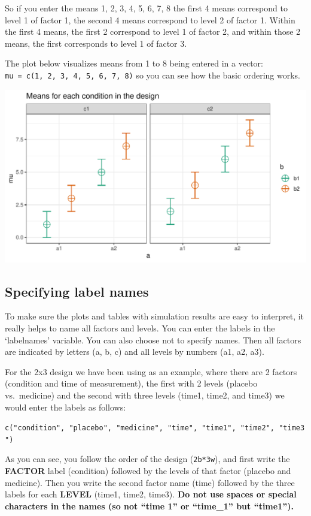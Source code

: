\documentclass[]{book}
\begin{document}
So if you enter the means 1, 2, 3, 4, 5, 6, 7, 8 the first 4 means correspond to level 1 of factor 1, the second 4 means correspond to level 2 of factor 1. Within the first 4 means, the first 2 correspond to level 1 of factor 2, and within those 2 means, the first corresponds to level 1 of factor 3.

The plot below visualizes means from 1 to 8 being entered in a vector: \texttt{mu\ =\ c(1,\ 2,\ 3,\ 4,\ 5,\ 6,\ 7,\ 8)} so you can see how the basic ordering works.

\includegraphics{SuperpowerValidation_files/figure-latex/unnamed-chunk-2-1.pdf}

\hypertarget{specifying-label-names}{%
\subsection{Specifying label names}\label{specifying-label-names}}

To make sure the plots and tables with simulation results are easy to interpret, it really helps to name all factors and levels. You can enter the labels in the `labelnames' variable. You can also choose not to specify names. Then all factors are indicated by letters (a, b, c) and all levels by numbers (a1, a2, a3).

For the 2x3 design we have been using as an example, where there are 2 factors (condition and time of measurement), the first with 2 levels (placebo vs.~medicine) and the second with three levels (time1, time2, and time3) we would enter the labels as follows:

\texttt{c("condition",\ "placebo",\ "medicine",\ "time",\ "time1",\ "time2",\ "time3")}

As you can see, you follow the order of the design (\texttt{2b*3w}), and first write the \textbf{FACTOR} label (condition) followed by the levels of that factor (placebo and medicine). Then you write the second factor name (time) followed by the three labels for each \textbf{LEVEL} (time1, time2, time3). \textbf{Do not use spaces or special characters in the names (so not ``time 1'' or ``time\_1'' but ``time1'').}
\end{document}
